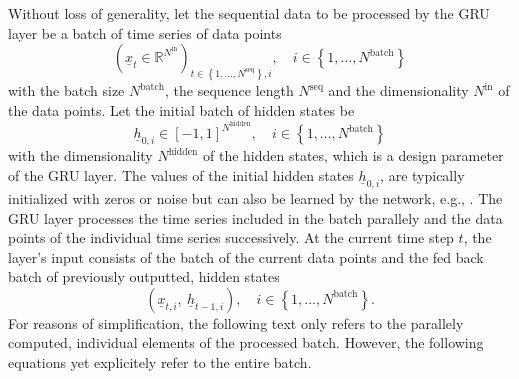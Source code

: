 Without loss of generality,
let the sequential data to be processed by the GRU layer
be a batch of time series of data points
\begin{equation}
    \left(
        \underline x_t
        \in \mathbb{R}^{N^\text{in}}
    \right)_{
        t \in \left\{
            1, \dots, N^\text{seq}
        \right\}
        ,
        i
    }
    ,\quad
    i \in \left\{
        1, \dots, N^\text{batch}
    \right\}
\end{equation}
with the batch size $N^\text{batch}$, 
the sequence length $N^\text{seq}$
and the dimensionality $N^\text{in}$ of the data points.
Let the initial batch of hidden states be
\begin{equation} \label{eq:gru_init_hidden_state}
    \underline h_{0,i}
    \in \left[-1, 1\right]^{N^\text{hidden}}
    ,\quad
    i \in \left\{
        1, \dots, N^\text{batch}
    \right\}
\end{equation}
with the dimensionality $N^\text{hidden}$ of the hidden states,
which is a design parameter of the GRU layer.
The values of the initial hidden states $\underline h_{0,i}$,
are typically initialized with zeros or noise \cite{Zimmermann2012}
but can also be learned by the network, e.g., \cite{Forcada1995}.
The GRU layer processes the time series included in the batch parallely 
and the data points of the individual time series successively.
At the current time step $t$,
the layer's input consists of 
the batch of the current data points
and the fed back batch of previously outputted, hidden states
\begin{equation}
    \left(
    \underline x_{t,i}
    ,\ 
    \underline h_{t-1,i}
    \right)
    ,\quad
    i \in \left\{
        1, \dots, N^\text{batch}
    \right\}.
\end{equation}
For reasons of simplification,
the following text only refers to the parallely computed, 
individual elements of the processed batch.
However, the following equations yet explicitely refer to the entire batch.


